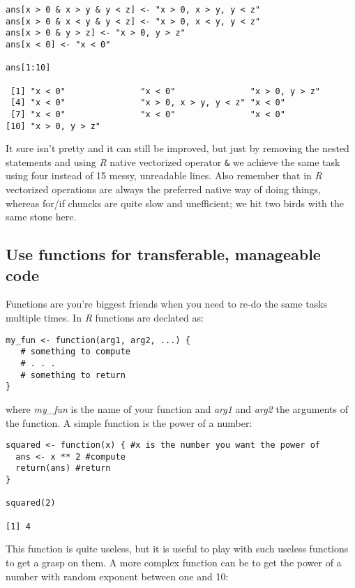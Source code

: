 \documentclass{book}
\begin{document}
\begin{lstlisting}[showstringspaces=false]
ans[x > 0 & x > y & y < z] <- "x > 0, x > y, y < z"
ans[x > 0 & x < y & y < z] <- "x > 0, x < y, y < z"
ans[x > 0 & y > z] <- "x > 0, y > z"
ans[x < 0] <- "x < 0"

ans[1:10]

 [1] "x < 0"               "x < 0"               "x > 0, y > z"       
 [4] "x < 0"               "x > 0, x > y, y < z" "x < 0"              
 [7] "x < 0"               "x < 0"               "x < 0"              
[10] "x > 0, y > z"   
\end{lstlisting}

It sure isn't pretty and it can still be improved, but just by removing the nested statements and using \textit{R} native vectorized operator \texttt{\&} we achieve the same task using four instead of 15 messy, unreadable lines. Also remember that in \textit{R} vectorized operations are always the preferred native way of doing things, whereas for/if chuncks are quite slow and unefficient; we hit two birds with the same stone here.

\subsection{Use functions for transferable, manageable code}

Functions are you're biggest friends when you need to re-do the same tasks multiple times. In \textit{R} functions are declated as:

\begin{lstlisting}[showstringspaces=false]
my_fun <- function(arg1, arg2, ...) {
   # something to compute
   # . . . 
   # something to return
}
\end{lstlisting}

where \textit{my\_fun} is the name of your function and \textit{arg1} and \textit{arg2} the arguments of the function. A simple function is the power of a number:

\begin{lstlisting}[showstringspaces=false]
squared <- function(x) { #x is the number you want the power of
  ans <- x ** 2 #compute
  return(ans) #return
}

squared(2)

[1] 4
\end{lstlisting}

This function is quite useless, but it is useful to play with such useless functions to get a grasp on them. A more complex function can be to get the power of a number with random exponent between one and 10:
\end{document}
